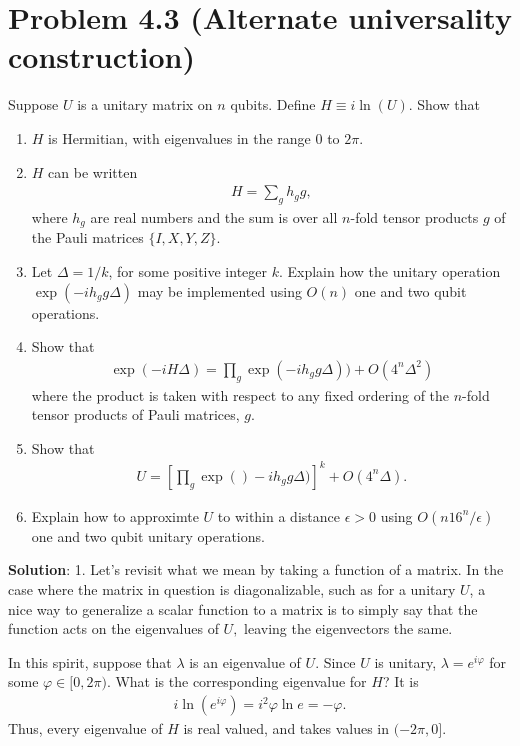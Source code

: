 \documentclass{book}
\begin{document}
\section*{Problem 4.3 (Alternate universality construction)}
    Suppose $U$ is a unitary matrix on $n$ qubits. Define $H \equiv i \ln(U)$. Show that
    \begin{enumerate}
        \item $H$ is Hermitian, with eigenvalues in the range $0$ to $2\pi$.
        \item $H$ can be written
        \begin{align}
            H = \sum_g h_g g,
        \end{align}
        where $h_g$ are real numbers and the sum is over all $n$-fold tensor products $g$ of the Pauli matrices $\{I, X, Y, Z\}$.
        \item Let $\Delta = 1/k$, for some positive integer $k$. Explain how the unitary operation $\exp(-i h_g g \Delta)$ may be implemented using $O(n)$ one and two qubit operations.
        \item Show that
        \begin{align}
            \exp(-i H \Delta) = \prod_g \exp(-i h_g g \Delta)) + O(4^n \Delta^2)
        \end{align}
        where the product is taken with respect to any fixed ordering of the $n$-fold tensor products of Pauli matrices, $g$.
        \item Show that
        \begin{align}
            U = \left[\prod_g \exp()-i h_g g \Delta)\right]^k + O(4^n \Delta).
        \end{align}
        \item Explain how to approximte $U$ to within a distance $\epsilon >0$ using $O(n16^n/\epsilon)$ one and two qubit unitary operations.
    \end{enumerate}

    \textbf{Solution}: 1. Let's revisit what we mean by taking a function of a matrix. In the case where the matrix in question is diagonalizable, such as for a unitary $U$, a nice way to generalize a scalar function to a matrix is to simply say that the function acts on the eigenvalues of $U,$ leaving the eigenvectors the same. 

    In this spirit, suppose that $\lambda$ is an eigenvalue of $U$. Since $U$ is unitary, $\lambda = e^{i\varphi}$ for some $\varphi \in [0,2\pi)$. What is the corresponding eigenvalue for $H$? It is
    \begin{align}
        i \ln (e^{i\varphi}) = i^2 \varphi \ln e = -\varphi.
    \end{align}
    Thus, every eigenvalue of $H$ is real valued, and takes values in $(-2\pi,0]$.
\end{document}
